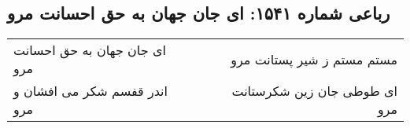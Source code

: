 \begin{center}
\section*{رباعی شماره ۱۵۴۱: ای جان جهان به حق احسانت مرو}
\label{sec:1541}
\begin{longtable}{l p{0.5cm} r}
ای جان جهان به حق احسانت مرو
&&
مستم مستم ز شیر پستانت مرو
\\
اندر قفسم شکر می افشان و مرو
&&
ای طوطی جان زین شکرستانت مرو
\\
\end{longtable}
\end{center}
